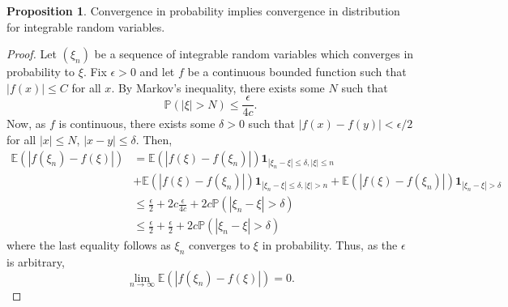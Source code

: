 \documentclass[]{article}
\theoremstyle{definition}
\theoremstyle{definition}
\newtheorem{proposition}{Proposition}[section]
\begin{document}
\begin{proposition}
  Convergence in probability implies convergence in distribution for integrable 
  random variables.
\end{proposition}
\begin{proof}
  Let \((\xi_n)\) be a sequence of integrable random variables which converges 
  in probability to \(\xi\). Fix \(\epsilon > 0\) and let \(f\) be a continuous 
  bounded function such that \(|f(x)| \le C\) for all \(x\). By Markov's 
  inequality, there exists some \(N\) such that 
  \[\mathbb{P}(|\xi| > N) \le \frac{\epsilon}{4c}.\]
  Now, as \(f\) is continuous, there exists some \(\delta > 0\) such that 
  \(|f(x) - f(y)| < \epsilon / 2\) for all \(|x|\le N\), \(|x - y| \le \delta\).
  Then, 
  \[\begin{split}
    \mathbb{E}(|f(\xi_n) - f(\xi)|) & = 
    \mathbb{E}(|f(\xi) - f(\xi_n)|)\mathbf{1}_{|\xi_n - \xi| \le \delta, |\xi| \le n}\\
    & + \mathbb{E}(|f(\xi) - f(\xi_n)|)\mathbf{1}_{|\xi_n - \xi| \le \delta, |\xi| > n}
    + \mathbb{E}(|f(\xi) - f(\xi_n)|)\mathbf{1}_{|\xi_n - \xi| > \delta}\\
    & \le \frac{\epsilon}{2} + 2c \frac{\epsilon}{4c} + 2c \mathbb{P}(|\xi_n - \xi| > \delta)\\
    & \le \frac{\epsilon}{2} + \frac{\epsilon}{2} + 2c \mathbb{P}(|\xi_n - \xi| > \delta)
  \end{split}\]
  where the last equality follows as \(\xi_n\) converges to \(\xi\) in probability.
  Thus, as the \(\epsilon\) is arbitrary, 
  \[\lim_{n \to \infty} \mathbb{E}(|f(\xi_n) - f(\xi)|) = 0.\]
\end{proof}
\end{document}
